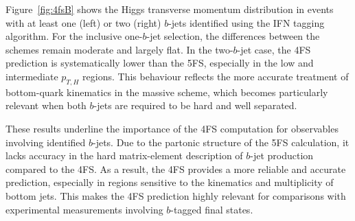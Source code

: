 \documentclass[11pt,a4paper]{article}
\begin{document}

Figure~\ref{fig:4fsB} shows the Higgs transverse momentum distribution in events with at least one (left) or two (right) $b$-jets identified using the IFN tagging algorithm. For the inclusive one-$b$-jet selection, the differences between the schemes remain moderate and largely flat. In the two-$b$-jet case, the 4FS prediction is systematically lower than the 5FS, especially in the low and intermediate $p_{T,H}$ regions. This behaviour reflects the more accurate treatment of bottom-quark kinematics in the massive scheme, which becomes particularly relevant when both $b$-jets are required to be hard and well separated.

These results underline the importance of the 4FS computation for observables involving identified $b$-jets. Due to the partonic structure of the 5FS calculation, it lacks accuracy in the hard matrix-element description of $b$-jet production compared to the 4FS. As a result, the 4FS provides a more reliable and accurate prediction, especially in regions sensitive to the kinematics and multiplicity of bottom jets. This makes the 4FS prediction highly relevant for comparisons with experimental measurements involving $b$-tagged final states.
\end{document}
